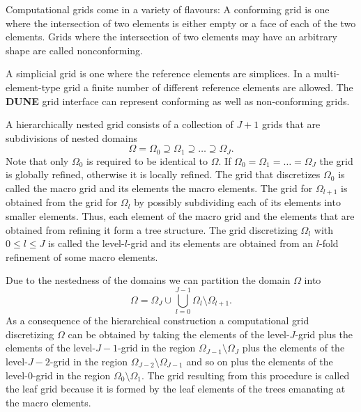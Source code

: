 \documentclass[11pt,a4paper,headinclude,footinclude,DIV16,normalheadings]{scrreprt}
\newcommand{\Dune}{{\sf\bfseries DUNE}}
\begin{document}

Computational grids come in a variety of flavours: A
{conforming} grid is one where the intersection of two
elements is either empty or a face of each of the two elements. 
Grids where the intersection of two elements may have an
arbitrary shape are called {nonconforming}. 


A {simplicial} grid is one where the reference elements are
simplices. In a {multi-element-type} grid a finite number of
different reference elements are allowed. The \Dune{} grid interface
can represent conforming as well as non-conforming grids.


A {hierarchically nested} grid consists of a collection of $J+1$
grids that are subdivisions of nested domains $$\Omega=\Omega_0 \supseteq \Omega_1 \supseteq
\ldots \supseteq \Omega_J.$$ Note that only $\Omega_0$ is required to
be identical to $\Omega$. If $\Omega_0=\Omega_1=\ldots=\Omega_J$ the
grid is {globally refined}, otherwise it is {locally refined}.
The grid that discretizes $\Omega_0$ is called the macro grid and its
elements the macro elements. The
grid for $\Omega_{l+1}$ is obtained from the grid
for $\Omega_l$ by possibly subdividing each of its elements into
smaller elements. Thus, each element of the macro grid and the
elements that are obtained from refining it form a tree structure. The
grid discretizing $\Omega_l$ with $0\leq l \leq J$ is called the level-$l$-grid and its
elements are obtained from an $l$-fold refinement of some macro elements.


Due to the nestedness of the domains we can partition the domain
$\Omega$ into $$\Omega = \Omega_J \cup \bigcup_{l=0}^{J-1}
\Omega_l\setminus\Omega_{l+1}.$$ As a consequence of the hierarchical
construction a computational grid discretizing $\Omega$ can be
obtained by taking the elements of the level-$J$-grid plus
the elements of the level-$J-1$-grid in the region
$\Omega_{J-1}\setminus\Omega_{J}$ plus the elements of the level-$J-2$-grid in the region
$\Omega_{J-2}\setminus\Omega_{J-1}$ and so on plus the elements of the level-$0$-grid in the region
$\Omega_{0}\setminus\Omega_{1}$. The grid resulting from this
procedure is called the leaf grid
because it is formed by the leaf elements of the trees emanating at
the macro elements. 

\end{document}
